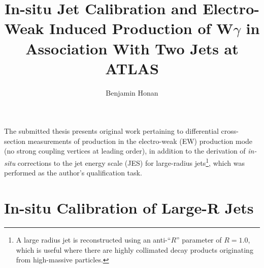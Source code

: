 \documentclass{thesissummary}
\begin{document}
\title{In-situ Jet Calibration and Electro-Weak Induced Production of W$\gamma$ in Association With Two Jets at ATLAS}

\author{ Benjamin Honan }

\address{School of Physics and Astronomy, University of Manchester, M13 9PL, United Kingdom}
\maketitle
\strut\newline
\noindent
The submitted thesis presents original work pertaining to differential cross-section measurements of \wyjj production in the electro-weak (EW) production mode (no strong coupling vertices at leading order), in addition to the derivation of \textit{in-situ} corrections to the jet energy scale (JES) for large-radius jets\footnote{A large radius jet is reconstructed using an anti-\kt ``$R$'' parameter of $R=1.0$, which is useful where there are highly collimated decay products originating from high-\pt massive particles.}, which was performed as the author's qualification task.

\section{In-situ Calibration of Large-R Jets}
\end{document}
